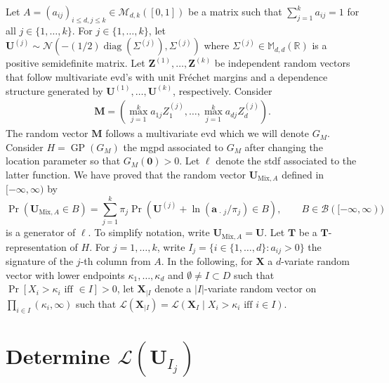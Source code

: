 \documentclass[
]{article}
\begin{document}
Let \(A=(a_{ij})_{i\leq d, j \leq k} \in \mathcal{M}_{d,k}([0,1])\) be a
matrix such that \(\sum_{j=1}^{k} a_{ij}=1\) for all
\(j\in \{1,\ldots,k\}\). For \(j \in \{1,\ldots,k\}\), let
\(\boldsymbol{U}^{(j)} \sim \mathcal{N}(-(1/2)\operatorname{diag}(\Sigma^{(j)}), \Sigma^{(j)})\)
where \(\Sigma^{(j)}\in \mathbb{M}_{d,d}(\mathbb{R})\) is a positive
semidefinite matrix. Let
\(\boldsymbol{Z}^{(1)},\ldots,\boldsymbol{Z}^{(k)}\) be independent
random vectors that follow multivariate evd's with unit Fréchet margins
and a dependence structure generated by
\(\boldsymbol{U}^{(1)},\ldots,\boldsymbol{U}^{(k)}\), respectively.
Consider \[
\begin{aligned}
\boldsymbol{M}=\left(\max_{j=1}^{k} a_{1j}Z_{1}^{(j)}, \ldots,\max_{j=1}^{k} a_{dj}Z_{d}^{(j)}\right).
\end{aligned}
\] The random vector \(\boldsymbol{M}\) follows a multivariate evd which
we will denote \(G_M\). Consider \(H=\operatorname{GP}(G_M)\) the mgpd
associated to \(G_M\) after changing the location parameter so that
\(G_M(\boldsymbol{0})>0\). Let \(\ell\) denote the stdf associated to
the latter function. We have proved that the random vector
\(\boldsymbol{U}_{\text{Mix},A}\) defined in
\([-\boldsymbol{\infty},\boldsymbol{\infty})\) by \begin{equation}
         \Pr(\boldsymbol{U}_{\text{Mix},A} \in B)= \sum_{j=1}^{k} \pi_j \Pr\left(\boldsymbol{U}^{(j)}+\ln(\boldsymbol{a}_{\,\cdot\,j}/ \pi_j) \in B\right), \qquad B \in \mathcal{B}([-\boldsymbol{\infty},\boldsymbol{\infty}))
         \label{equationgeneralgenerator}
    \end{equation} is a generator of \(\ell\). To simplify notation,
write \(\boldsymbol{U}_{\text{Mix},A}=\boldsymbol{U}\). Let
\(\boldsymbol{T}\) be a \(\boldsymbol{T}\)-representation of \(H\). For
\(j=1,\ldots,k\), write \(I_{j}=\{i \in \{1,\ldots,d\}: a_{ij}>0\}\) the
signature of the \(j\)-th column from \(A\). In the following, for
\(\boldsymbol{X}\) a \(d\)-variate random vector with lower endpoints
\(\kappa_1,\ldots,\kappa_d\) and \(\emptyset \neq I \subset D\) such
that \(\Pr[X_i>\kappa_i \text{ iff } \in I]>0\), let
\(\boldsymbol{X}_{\mid I}\) denote a \(\lvert I \rvert\)-variate random
vector on \(\prod_{i \in I} (\kappa_i,\infty)\) such that
\(\mathcal{L}(\boldsymbol{X}_{\mid I})= \mathcal{L}(\boldsymbol{X}_{I} \mid X_i>\kappa_i \text{ iff } i \in I)\).

\section{ Determine $\mathcal{L}(\boldsymbol{U}_{I_{j}})$ }
\label{sec:LawofU}
\end{document}
